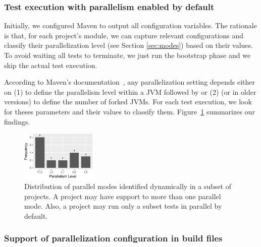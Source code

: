 \subsubsection{Test execution with parallelism enabled by default}
\label{sec:rqC-1}

Initially, we configured Maven to output all configuration variables.
The rationale is that, for each project's module, we can capture
relevant configurations and classify their parallelization level (see
Section \ref{sec:modes}) based on their values. To avoid waiting all
tests to terminate, we just run the bootstrap phase and we skip the
actual test execution.

According to Maven's documentation~\cite{maven-surefire-plugin}, any
parallelization setting depends either on (1)  to
define the parallelism level within a JVM followed by
 or (2)  (or 
in older versions) to define the number of forked JVMs. For each test
execution, we look for theses parameters and their values to classify
them.   Figure~\ref{fig:freqmodes-dynamic} summarizes our
findings.

\begin{figure}[h!]
    \centering
    \includegraphics[width=0.32\textwidth]{plots/barplot-modes-dynamic.pdf}
    \caption{\label{fig:freqmodes-dynamic}Distribution of parallel modes identified dynamically in a
    subset of \numProjectsPar{} projects.  A project may have support
    to more than one parallel mode. Also, a project may run only a
    subset tests in parallel by default.}
\end{figure}


\subsubsection{Support of parallelization configuration in build files}
\label{sec:rqC-2}

